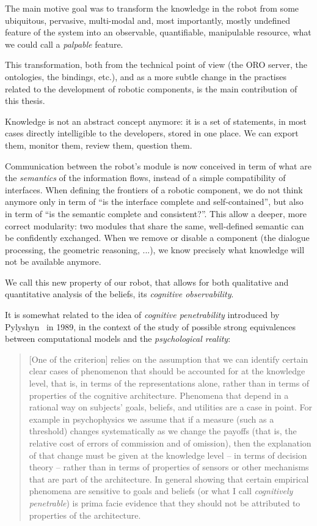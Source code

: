 \documentclass[letterpaper, 10 pt, conference]{ieeeconf}  %
\begin{document}
The main motive goal was to transform the knowledge in the robot from some ubiquitous,
pervasive, multi-modal and, most importantly, mostly undefined feature of the
system into an observable, quantifiable, manipulable resource, what we could
call a \emph{palpable} feature.

This transformation, both from the technical point of view (the ORO server, the
ontologies, the bindings, etc.), and as a more subtle change in the practises
related to the development of robotic components, is the main contribution of
this thesis.

Knowledge is not an abstract concept anymore: it is a set of statements, in
most cases directly intelligible to the developers, stored in one place. We can
export them, monitor them, review them, question them.

Communication between the robot's module is now conceived in term of what are
the \emph{semantics} of the information flows, instead of a simple
compatibility of interfaces. When defining the frontiers of a robotic
component, we do not think anymore only in term of ``is the interface complete
and self-contained'', but also in term of ``is the semantic complete and
consistent?''. This allow a deeper, more correct modularity: two modules that
share the same, well-defined semantic can be confidently exchanged. When we
remove or disable a component (the dialogue processing, the geometric
reasoning, ...), we know precisely what knowledge will not be available
anymore.

We call this new property of our robot, that allows for both qualitative and
quantitative analysis of the beliefs, its \emph{cognitive observability}.

It is somewhat related to the idea of \emph{cognitive penetrability} introduced
by Pylyshyn~\cite{Pylyshyn1989} in 1989, in the context of the study of
possible strong equivalences between computational models and the
\emph{psychological reality}:

\begin{quote}

    [One of the criterion] relies on the assumption that we can identify
    certain clear cases of phenomenon that should be accounted for at the
    knowledge level, that is, in terms of the representations alone, rather
    than in terms of properties of the cognitive architecture. Phenomena that
    depend in a rational way on subjects' goals, beliefs, and utilities are a
    case in point. For example in psychophysics we assume that if a measure
    (such as a threshold) changes systematically as we change the payoffs (that
    is, the relative cost of errors of commission and of omission), then the
    explanation of that change must be given at the knowledge level -- in terms
    of decision theory -- rather than in terms of properties of sensors or
    other mechanisms that are part of the architecture. In general showing that
    certain empirical phenomena are sensitive to goals and beliefs (or what I
    call \emph{cognitively penetrable}) is prima facie evidence that they
    should not be attributed to properties of the architecture.

\end{quote}
\end{document}

